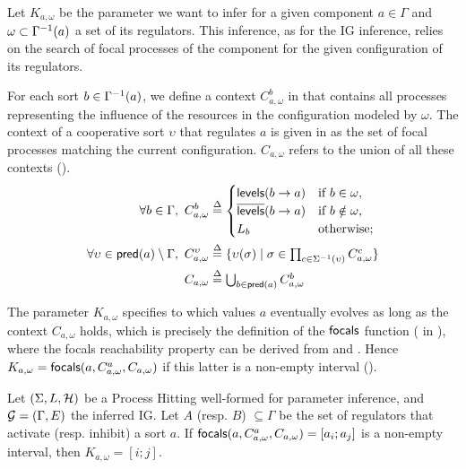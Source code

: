 Let $K_{a,\omega}$ be the parameter we want to infer for a given component $a \in \Gamma$
and $\omega \subset \Gamma^{-1}(a)$ a set of its regulators.
This inference, as for the IG inference, relies on the search of focal processes of the component for the given configuration of its regulators.

For each sort $b \in \Gamma^{-1}(a)$, we define a context $C^b_{a,\omega}$ in  that contains all processes representing the influence of the resources in the configuration modeled by $\omega$.
The context of a cooperative sort $\upsilon$ that regulates $a$ is given in
 as the set of focal processes matching the current configuration.
$C_{a,\omega}$ refers to the union of all these contexts ().
\begin{align}
\label{eq:param_context}
\forall b\in\Gamma,~
C_{a,\omega}^b & \stackrel{\Delta}= \begin{cases}
  \mathsf{levels}(b\rightarrow a) & \text{if $b \in \omega$,}\\
  \overline{\mathsf{levels}}(b\rightarrow a) & \text{if $b \notin \omega$,}\\
  L_b            & \text{otherwise;}\\
\end{cases}
\\
\label{eq:param_context_coop}
\forall \upsilon \in \mathsf{pred}(a)\setminus\Gamma,~
C_{a,\omega}^\upsilon & \stackrel{\Delta}= \{
\upsilon(\sigma) \mid \sigma \in \textstyle\prod_{c\in\Sigma^{-1}(\upsilon)}C_{a,\omega}^c \}
\\
C_{a,\omega} & \stackrel{\Delta}= \textstyle\bigcup_{b\in\mathsf{pred}(a)} C^b_{a,\omega}
\label{eq:K-ctx}
\end{align}

The parameter $K_{a,\omega}$ specifies to which values $a$ eventually evolves as long as the context
$C_{a,\omega}$ holds, which is precisely the definition of the $\mathsf{focals}$ function
( in ),
where the focals reachability property can be derived from  and
.
Hence $K_{a,\omega} = \mathsf{focals}(a,C^a_{a,\omega},C_{a,\omega})$ if this latter is a non-empty interval
().

\begin{proposition}
\label{pps:param_K}
Let $(\Sigma, L, \mathcal{H})$ be a Process Hitting well-formed for parameter inference, and $\mathcal{G} = (\Gamma, E)$ the inferred IG.
Let $A$ (resp. $B$) $\subseteq \Gamma$ be the set of regulators that activate (resp. inhibit) a sort
$a$.
If $\mathsf{focals}(a,C^a_{a,\omega},C_{a,\omega})=[a_i;a_j]$ is a non-empty interval, 
	then $K_{a,\omega} = [i;j]$.
\end{proposition}

